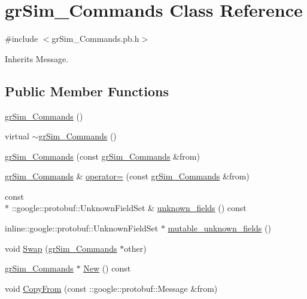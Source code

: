 \hypertarget{classgr_sim___commands}{\section{gr\-Sim\-\_\-\-Commands Class Reference}
\label{classgr_sim___commands}
}


{\ttfamily \#include $<$gr\-Sim\-\_\-\-Commands.\-pb.\-h$>$}



Inherits Message.

\subsection*{Public Member Functions}
\begin{DoxyCompactItemize}
\item 
\hyperlink{classgr_sim___commands_abcf82bd3b76dfd35eb95f37946166e01}{gr\-Sim\-\_\-\-Commands} ()
\item 
virtual \hyperlink{classgr_sim___commands_aac7782e90e77fdb9afc17b1bc497505e}{$\sim$gr\-Sim\-\_\-\-Commands} ()
\item 
\hyperlink{classgr_sim___commands_ac9aa477e8fe7575e586f6e66259fbe6b}{gr\-Sim\-\_\-\-Commands} (const \hyperlink{classgr_sim___commands}{gr\-Sim\-\_\-\-Commands} \&from)
\item 
\hyperlink{classgr_sim___commands}{gr\-Sim\-\_\-\-Commands} \& \hyperlink{classgr_sim___commands_a53ee1c5b94e2d777f149ab0bc4d325da}{operator=} (const \hyperlink{classgr_sim___commands}{gr\-Sim\-\_\-\-Commands} \&from)
\item 
const \\*
\-::google\-::protobuf\-::\-Unknown\-Field\-Set \& \hyperlink{classgr_sim___commands_a9515959a93e9bbbc9d67317059406f95}{unknown\-\_\-fields} () const 
\item 
inline\-::google\-::protobuf\-::\-Unknown\-Field\-Set $\ast$ \hyperlink{classgr_sim___commands_a935e42d370b192002d6f4b7941d44159}{mutable\-\_\-unknown\-\_\-fields} ()
\item 
void \hyperlink{classgr_sim___commands_ab26cbfa222a404a77ab8192cc87a4db0}{Swap} (\hyperlink{classgr_sim___commands}{gr\-Sim\-\_\-\-Commands} $\ast$other)
\item 
\hyperlink{classgr_sim___commands}{gr\-Sim\-\_\-\-Commands} $\ast$ \hyperlink{classgr_sim___commands_a39418f897c98a9973f69a637c0ed63c6}{New} () const 
\item 
void \hyperlink{classgr_sim___commands_a63670f395f8dbc8e7126f5101c8c4f2a}{Copy\-From} (const \-::google\-::protobuf\-::\-Message \&from)

\end{DoxyCompactItemize}
